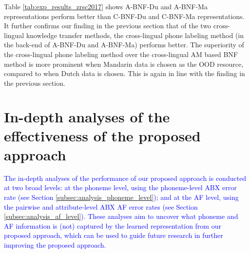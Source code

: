 \documentclass[transmag]{IEEEtran}
\begin{document}
Table \ref{tab:exp_results_zrsc2017}   shows
A-BNF-Du and A-BNF-Ma representations  perform better than C-BNF-Du and C-BNF-Ma representations. It  further confirms our finding in the previous section that of the two cross-lingual knowledge transfer methods, the cross-lingual phone labeling method (in the back-end of A-BNF-Du and A-BNF-Ma) performs better. The superiority of the cross-lingual phone labeling method over the cross-lingual AM based BNF method is more prominent when Mandarin data is chosen as the OOD resource, compared to when Dutch data is chosen. This is again in line with the finding in the previous section.




\section{In-depth analyses  of the effectiveness of the proposed approach}
\label{sec:analysis_on_results}
\textcolor{blue}{The in-depth analyses of the performance of our proposed approach is conducted at two broad levels: at the phoneme level, using the phoneme-level ABX error rate (see Section \ref{subsec:analysis_phoneme_level}); and at the AF level, using the pairwise and attribute-level ABX AF error rates (see Section \ref{subsec:analysis_af_level}). 
These analyses aim to uncover what phoneme and AF information is (not) captured by the learned representation from our proposed approach, which can be used to guide future research in further improving  the proposed approach.
}
\end{document}
